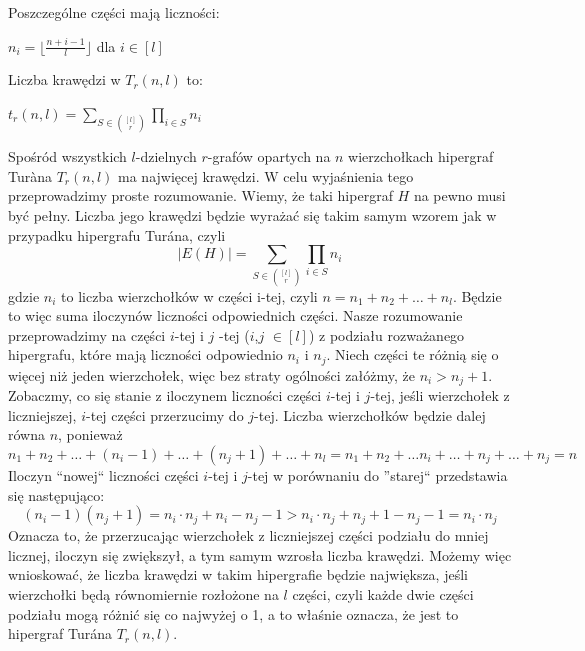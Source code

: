 \documentclass[miz,woman]{mgrwms}
\begin{document}
Poszczególne części mają liczności:
\begin{center}
 $n_i=\lfloor \frac{n+i-1}{l}\rfloor$ dla $i \in [l]$
\end{center}
Liczba krawędzi w $T_r(n,l)$ to:
\begin{center}
 $t_r(n,l)=\sum \limits_{S \in {[l] \choose r}} \prod \limits_{i \in S} n_i$
\end{center}
Spośród wszystkich $l$-dzielnych $r$-grafów opartych na $n$ wierzchołkach hipergraf Tur\`{a}na $T_r(n,l)$ ma najwięcej krawędzi. 
W celu wyjaśnienia tego przeprowadzimy proste rozumowanie. Wiemy, że taki hipergraf $H$ na pewno musi być pełny. Liczba jego krawędzi 
będzie wyrażać się takim samym wzorem jak w przypadku hipergrafu Tur\'ana, czyli 
\begin{equation}
 |E(H)|=\sum \limits_{S \in {[l] \choose r}} \prod \limits_{i \in S} n_i
\end{equation}
gdzie $n_i$ to liczba wierzchołków w części i-tej, czyli
$n=n_1+n_2+\dots +n_l$.
Będzie to więc suma iloczynów liczności odpowiednich części. Nasze rozumowanie przeprowadzimy na
części $i$-tej i $j$ -tej ($i$,$j$ $\in [l]$) z podziału rozważanego hipergrafu, które mają liczności odpowiednio $n_i$ i $n_j$. Niech
części te różnią się o więcej niż jeden wierzchołek, więc bez straty ogólności załóżmy, że $n_i>n_j+1$. Zobaczmy, co się stanie
z iloczynem liczności części $i$-tej i $j$-tej,
jeśli wierzchołek z liczniejszej, $i$-tej części przerzucimy do $j$-tej. Liczba wierzchołków będzie dalej równa $n$, ponieważ
\begin{equation}
 n_1+n_2+\dots+(n_i-1)+\dots +(n_j+1)+\dots +n_l=n_1+n_2+\dots n_i+\dots +n_j+\dots +n_j=n
\end{equation}
Iloczyn ``nowej`` liczności części $i$-tej i $j$-tej w porównaniu do ''starej`` przedstawia się następująco:
\begin{equation}
(n_i-1)(n_j+1)=n_i \cdot n_j+n_i-n_j-1>n_i \cdot n_j+n_j+1-n_j-1=n_i \cdot n_j
\end{equation}
Oznacza to, że przerzucając wierzchołek z liczniejszej części podziału do mniej licznej, iloczyn się zwiększył, a tym samym 
wzrosła liczba krawędzi. Możemy więc wnioskować, że liczba krawędzi w takim hipergrafie będzie największa, jeśli wierzchołki
będą równomiernie rozłożone na $l$ części, czyli każde dwie części podziału mogą różnić się co najwyżej o 1, a to właśnie oznacza,
że jest to hipergraf Tur\'ana $T_r(n,l)$.
\end{document}
